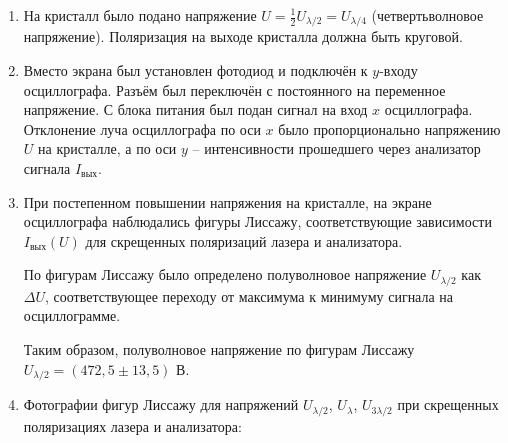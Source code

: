 \documentclass[12pt, a4paper]{article}
\begin{document}
\begin{enumerate}
    С увеличением напряжения на кристалле яркость пятна на экране увеличивалась и достигала максимума при $U = U_{\lambda/2}$. При $U = 2U_{\lambda/2} = U_{\lambda}$ яркость снова была минимальной и т. д.
    
    
    Таким образом, определено полуволновое напряжение ниобата лития: $U_{\lambda/2} = (475,5 \pm 11,9)$ В
    
    \item На кристалл было подано напряжение $U = \frac{1}{2}U_{\lambda/2} = U_{\lambda/4}$ (четвертьволновое напряжение). Поляризация на выходе кристалла должна быть круговой. %
    
    \item Вместо экрана был установлен фотодиод и подключён к $y$-входу осциллографа. Разъём был переключён с постоянного на переменное напряжение. С блока питания был подан сигнал на вход $x$ осциллографа. Отклонение луча осциллографа по оси $x$ было пропорционально напряжению $U$ на кристалле, а по оси $y$ -- интенсивности прошедшего через анализатор сигнала $I_{\text{вых}}$.
    
    \item При постепенном повышении напряжения на кристалле, на экране осциллографа наблюдались фигуры Лиссажу, соответствующие зависимости $I_{\text{вых}}(U)$ для скрещенных поляризаций лазера и анализатора.
    
    По фигурам Лиссажу было определено полуволновое напряжение $U_{\lambda/2}$ как $\Delta U$, соответствующее переходу от максимума к минимуму сигнала на осциллограмме.
    
    Таким образом, полуволновое напряжение по фигурам Лиссажу $U_{\lambda/2} = (472,5\pm13,5)$ В.
    
    
    
    \item Фотографии фигур Лиссажу для напряжений $U_{\lambda/2}$, $U_{\lambda}$, $U_{3\lambda/2}$ при скрещенных поляризациях лазера и анализатора:
    



\end{enumerate}
\end{document}
